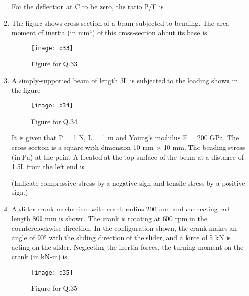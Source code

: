 \documentclass[journal,11pt,onecolumn]{IEEEtran}
\begin{document}
\begin{enumerate}[resume]
          For the deflection at C to be zero, the ratio P/F is \underline{\hspace{2cm}}

    \item The figure shows cross-section of a beam subjected to bending. The area moment of inertia (in mm$^4$) of this cross-section about its base is \underline{\hspace{2cm}}

          \begin{figure}[H]
              \centering
              \texttt{[image: q33]}
              \caption{Figure for Q.33}
              \label{q33}
          \end{figure}

    \item A simply-supported beam of length 3L is subjected to the loading shown in the figure.

          \begin{figure}[H]
              \centering
              \texttt{[image: q34]}
              \caption{Figure for Q.34}
              \label{q34}
          \end{figure}

          It is given that P = 1 N, L = 1 m and Young's modulus E = 200 GPa. The cross-section is a square with dimension 10 mm × 10 mm. The bending stress (in Pa) at the point A located at the top surface of the beam at a distance of 1.5L from the left end is \underline{\hspace{2cm}}

          (Indicate compressive stress by a negative sign and tensile stress by a positive sign.)

    \item A slider crank mechanism with crank radius 200 mm and connecting rod length 800 mm is shown. The crank is rotating at 600 rpm in the counterclockwise direction. In the configuration shown, the crank makes an angle of 90° with the sliding direction of the slider, and a force of 5 kN is acting on the slider. Neglecting the inertia forces, the turning moment on the crank (in kN-m) is \underline{\hspace{2cm}}

          \begin{figure}[H]
              \centering
              \texttt{[image: q35]}
              \caption{Figure for Q.35}
              \label{q35}
          \end{figure}


\end{enumerate}
\end{document}
